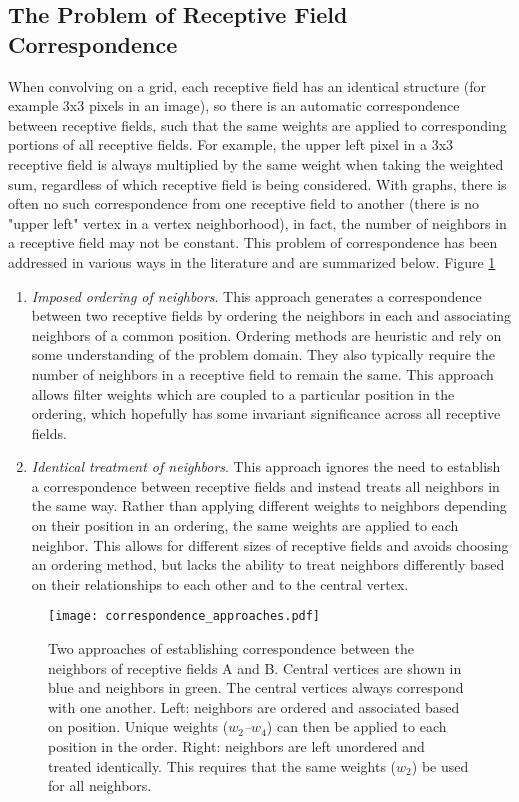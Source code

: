 \subsection{The Problem of Receptive Field Correspondence}
When convolving on a grid, each receptive field has an identical structure (for example 3x3 pixels in an image), so there is an automatic correspondence between receptive fields, such  that the same weights are applied to corresponding portions of all receptive fields. 
For example, the upper left pixel in a 3x3 receptive field is always multiplied by the same weight when taking the weighted sum, regardless of which receptive field is being considered.
With graphs, there is often no such correspondence from one receptive field to another (there is no "upper left" vertex in a vertex neighborhood), in fact, the number of neighbors in a receptive field may not be constant.
This problem of correspondence has been addressed in various ways in the literature and are summarized below. Figure \ref{fig:correspondence_approaches}
\begin{enumerate}
	\item \textit{Imposed ordering of neighbors}. This approach generates a correspondence between two receptive fields by ordering the neighbors in each and associating neighbors of a common position. 
	Ordering methods are heuristic and rely on some understanding of the problem domain.
	They also typically require the number of neighbors in a receptive field to remain the same.
	This approach allows filter weights which are coupled to a particular position in the ordering, which hopefully has some invariant significance across all receptive fields.
	
	\item \textit{Identical treatment of neighbors}. This approach ignores the need to establish a correspondence between receptive fields and instead treats all neighbors in the same way.
	Rather than applying different weights to neighbors depending on their position in an ordering, the same weights are applied to each neighbor.
	This allows for different sizes of receptive fields and avoids choosing an ordering method, but lacks the ability to treat neighbors differently based on their relationships to each other and to the central vertex.
\end{enumerate}

\begin{figure}
	\centering
	\texttt{[image: correspondence\_approaches.pdf]}
	\caption{Two approaches of establishing correspondence between the neighbors of receptive fields A and B. Central vertices are shown in blue and neighbors in green. The central vertices always correspond with one another. Left: neighbors are ordered and associated based on position. Unique weights (\textit{$w_2$--$w_4$}) can then be applied to each position in the order. Right: neighbors are left unordered and treated identically. This requires that the same weights (\textit{$w_2$}) be used for all neighbors.}
	\label{fig:correspondence_approaches}
\end{figure}


